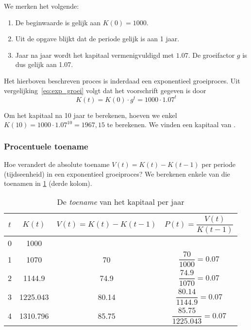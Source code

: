 We merken het volgende:
\begin{enumerate}
\item De beginwaarde is gelijk aan $K(0)=1000$.
\item Uit de opgave blijkt dat de periode gelijk is aan 1 jaar.
\item Jaar na jaar wordt het kapitaal vermenigvuldigd met $\num{1.07}$. De groeifactor $g$ is dus gelijk aan \num{1.07}.
\end{enumerate}
Het hierboven beschreven proces is inderdaad een exponentieel groeiproces. Uit vergelijking~\eqref{eq:exp_groei} volgt dat het voorschrift gegeven is door 
\begin{equation}
     K(t)=K(0)\cdot g^{t}=1000\cdot \num{1.07}^{t}
    \label{eq:si}
\end{equation}

Om het kapitaal na 10 jaar te berekenen, hoeven we enkel $K(10)=1000\cdot \num{1.07}^{10}=1967,15$ te berekenen. We vinden een kapitaal van .

\subsubsection{Procentuele toename}
Hoe verandert de absolute toename $V(t)=K(t)-K(t-1)$ per periode (tijdseenheid) in een
exponentieel groeiproces?  We berekenen enkele van die toenamen in
\cref{tbl:samgesint} (derde kolom). 
\begin{table}[htb]
    \centering
    \caption{De \emph{toename} van het kapitaal per jaar}
    \begin{tabular}{cccc}
     \toprule
    $t$ & $K(t)$ & $V(t)=K(t)-K(t-1)$  & $ P(t)=\dfrac{V(t)}{K(t-1)}$\\
    \midrule
    0 & 1000 &   &\\

    1 & 1070 & 70&$\dfrac{70}{1000}=\num{0.07}$   \\[10pt]

    2 & \num{1144,9} & \num{74,9} & $\dfrac{\num{74.9}}{1070}=\num{0.07}$  \\[10pt]

    3 & \num{1225,043} & \num{80,14} &$\dfrac{\num{80.14}}{\num{1144.9}}=\num{0.07}$ \\[10pt]

    4 & \num{1310,796} & \num{85,75}  & $\dfrac{\num{85,75}}{\num{1225,043}}=\num{0.07}$\\
    \bottomrule
\end{tabular}
    \label{tbl:samgesint}
\end{table}

